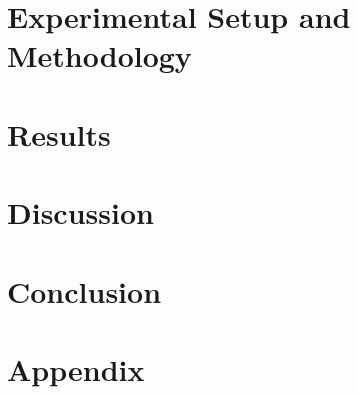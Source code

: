\documentclass[12pt]{article}
\begin{document}
\section{Experimental Setup and Methodology}
\section{Results }
\section{Discussion}
\section{Conclusion}
\section{Appendix}
\printbibliography 
\end{document}
